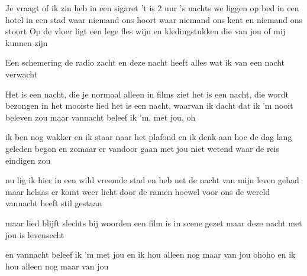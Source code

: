 \begin{verse*}
Je vraagt of ik zin heb in een sigaret
't is 2 uur 's nachts we liggen op bed
in een hotel in een stad
waar niemand ons hoort
waar niemand ons kent
en niemand ons stoort
Op de vloer ligt een lege fles wijn
en kledingstukken die van jou of mij kunnen zijn
\end{verse*}

\begin{verse*}
Een schemering
de radio zacht
en deze nacht heeft alles
wat ik van een nacht verwacht
\end{verse*}

\begin{chorus}
Het is een nacht, die je normaal alleen in films ziet
het is een nacht, die wordt bezongen in het mooiste lied
het is een nacht, waarvan ik dacht dat ik 'm nooit beleven zou
maar vannacht beleef ik 'm, met jou, oh
\end{chorus}

\begin{verse*}
ik ben nog wakker en ik staar naar het plafond
en ik denk aan hoe de dag lang geleden begon
en zomaar er vandoor gaan met jou
niet wetend waar de reis eindigen zou
\end{verse*}

\begin{verse*}
nu lig ik hier in een wild vreemde stad
en heb net de nacht van mijn leven gehad
maar helaas er komt weer licht door de ramen
hoewel voor ons de wereld vannacht heeft stil gestaan
\end{verse*}

\thechorus

\begin{verse*}
maar lied blijft slechts bij woorden
een film is in scene gezet
maar deze nacht met jou is levensecht
\end{verse*}

\thechorus

\begin{verse*}
en vannacht beleef ik 'm met jou
en ik hou alleen nog maar van jou ohoho
en ik hou alleen nog maar van jou
\end{verse*}
